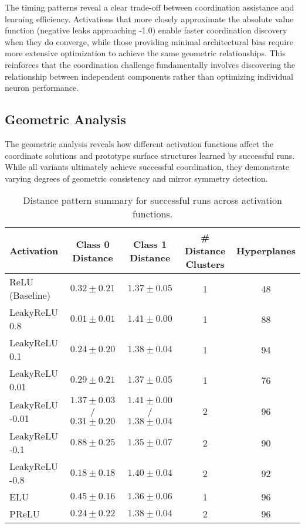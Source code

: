 The timing patterns reveal a clear trade-off between coordination assistance and learning efficiency. Activations that more closely approximate the absolute value function (negative leaks approaching -1.0) enable faster coordination discovery when they do converge, while those providing minimal architectural bias require more extensive optimization to achieve the same geometric relationships. This reinforces that the coordination challenge fundamentally involves discovering the relationship between independent components rather than optimizing individual neuron performance.


\subsection*{Geometric Analysis}

The geometric analysis reveals how different activation functions affect the coordinate solutions and prototype surface structures learned by successful runs. While all variants ultimately achieve successful coordination, they demonstrate varying degrees of geometric consistency and mirror symmetry detection.

\begin{table}[ht]
\centering
\caption{Distance pattern summary for successful runs across activation functions.}
\label{tab:relu1-activation-distance}
\begin{tabular}{lcccc}
\toprule
Activation & Class 0 Distance & Class 1 Distance & \# Distance Clusters & Hyperplanes \\
\midrule
ReLU (Baseline) & $0.32 \pm 0.21$ & $1.37 \pm 0.05$ & 1 & 48 \\
LeakyReLU 0.8 & $0.01 \pm 0.01$ & $1.41 \pm 0.00$ & 1 & 88 \\
LeakyReLU 0.1 & $0.24 \pm 0.20$ & $1.38 \pm 0.04$ & 1 & 94 \\
LeakyReLU 0.01 & $0.29 \pm 0.21$ & $1.37 \pm 0.05$ & 1 & 76 \\
LeakyReLU -0.01 & $1.37 \pm 0.03$ / $0.31 \pm 0.20$ & $1.41 \pm 0.00$ / $1.38 \pm 0.04$ & 2 & 96 \\
LeakyReLU -0.1 & $0.88 \pm 0.25$ & $1.35 \pm 0.07$ & 2 & 90 \\
LeakyReLU -0.8 & $0.18 \pm 0.18$ & $1.40 \pm 0.04$ & 2 & 92 \\
ELU & $0.45 \pm 0.16$ & $1.36 \pm 0.06$ & 1 & 96 \\
PReLU & $0.24 \pm 0.22$ & $1.38 \pm 0.04$ & 2 & 96 \\
\bottomrule
\end{tabular}
\end{table}

